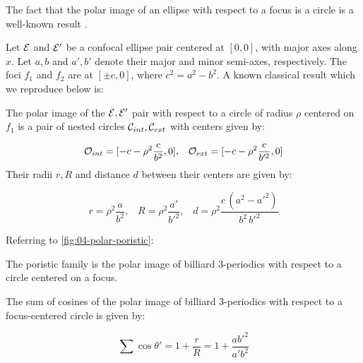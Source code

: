 The fact that the polar image of an ellipse with respect to a focus is a circle is a well-known result \cite{akopyan2007-conics}.

Let $\mathcal{E}$ and $\mathcal{E}'$ be a confocal ellipse pair centered at $[0,0]$, with major axes along $x$. Let $a,b$ and $a',b'$ denote their major and minor semi-axes, respectively. The foci $f_1$ and $f_2$ are at $[\pm c,0]$, where $c^2=a^2-b^2$. A known classical result which we reproduce below is:

\begin{lemma}
The polar image of the $\mathcal{E},\mathcal{E}'$ pair with respect to a circle of radius $\rho$ centered on $f_1$ is a pair of nested circles $\mathcal{C}_{int},\mathcal{C}_{ext}$ with centers given by:

\[\mathcal{O}_{int}=[-c-\rho^2\frac{c}{b^2},0],\;\;\;\mathcal{O}_{ext}=[-c-\rho^2\frac{c}{b'^2},0]\]
Their radii $r,R$ and distance $d$ between their centers are given by: 

\[ r=\rho^2\frac{a}{b^2},\;\;\;R=\rho^2\frac{a'}{b'^2},\;\;\; d=\rho^2\frac{ c\, (a^2 - {a'}^2)}{b^2\, {b'}^2} \]
\end{lemma}


 
Referring to \cref{fig:04-polar-poristic}:

\begin{corollary}
The poristic family is the polar image of billiard 3-periodics with respect to a circle centered on a focus. 
\label{cor:04-poristic-polar-image}
\end{corollary}

\begin{corollary}
The sum of cosines of the polar image of billiard 3-periodics with respect to a focus-centered circle is given by:

\begin{equation}
\sum\cos\theta' = 1+\frac{r}{R} = 1+\frac{a b'^2}{a' b^2}
\label{eq:04-bic-cos}
\end{equation}
\end{corollary}

